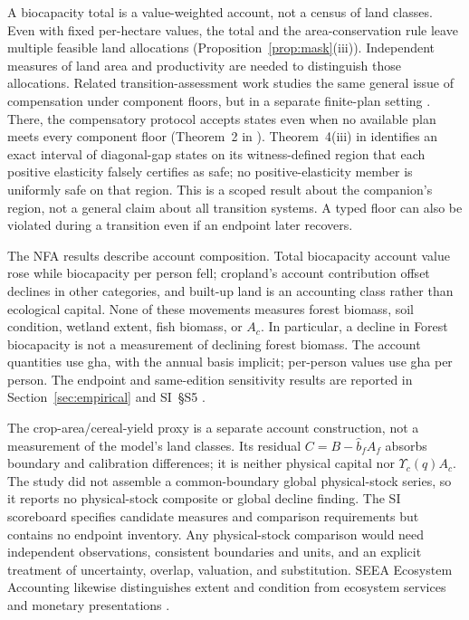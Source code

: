 \documentclass[preprint,12pt,authoryear]{elsarticle}
\newcommand{\Ups}{\Upsilon_c}
\begin{document}
A biocapacity total is a value-weighted account, not a census of land classes. Even with fixed per-hectare values, the total and the area-conservation rule leave multiple feasible land allocations (Proposition~\ref{prop:mask}(iii)). Independent measures of land area and productivity are needed to distinguish those allocations. Related transition-assessment work studies the same general issue of compensation under component floors, but in a separate finite-plan setting \citep[Sections~2 and 4 of][]{Abaee2026b}. There, the compensatory protocol accepts states even when no available plan meets every component floor (Theorem~2 in \citet{Abaee2026b}). Theorem~4(iii) in \citet{Abaee2026b} identifies an exact interval of diagonal-gap states on its witness-defined region that each positive elasticity falsely certifies as safe; no positive-elasticity member is uniformly safe on that region. This is a scoped result about the companion's region, not a general claim about all transition systems. A typed floor can also be violated during a transition even if an endpoint later recovers.

The NFA results describe account composition. Total biocapacity account value rose while biocapacity per person fell; cropland's account contribution offset declines in other categories, and built-up land is an accounting class rather than ecological capital. None of these movements measures forest biomass, soil condition, wetland extent, fish biomass, or $A_c$. In particular, a decline in Forest biocapacity is not a measurement of declining forest biomass. The account quantities use gha, with the annual basis implicit; per-person values use gha per person. The endpoint and same-edition sensitivity results are reported in Section~\ref{sec:empirical} and SI~\S S5 \citep{Lo2026NFA,Borucke2013,Blomqvist2013,GiampietroSaltelli2014,Galli2016,vdBerghGrazi2015}.

The crop-area/cereal-yield proxy is a separate account construction, not a measurement of the model's land classes. Its residual $C=B-\hat b_fA_f$ absorbs boundary and calibration differences; it is neither physical capital nor $\Ups(q)A_c$. The study did not assemble a common-boundary global physical-stock series, so it reports no physical-stock composite or global decline finding. The SI scoreboard specifies candidate measures and comparison requirements but contains no endpoint inventory. Any physical-stock comparison would need independent observations, consistent boundaries and units, and an explicit treatment of uncertainty, overlap, valuation, and substitution. SEEA Ecosystem Accounting likewise distinguishes extent and condition from ecosystem services and monetary presentations \citep{UN2021SEEA_EA}.
\end{document}
